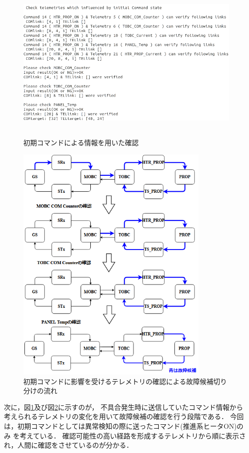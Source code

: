 \documentclass[11pt]{jsreport}
\begin{document}
\begin{figure}[H]
   \centering
      \includegraphics[height=8.0cm]{figure/COM14_TEL17_iniCOM_phase.png}
      \caption{初期コマンドによる情報を用いた確認}
      \label{fig:ini_COM_phase}
\end{figure}
\begin{figure}[H]
   \centering
      \includegraphics[height=12cm]{figure/iniCOM_process_HTR_PROP_fault.png}
      \caption{初期コマンドに影響を受けるテレメトリの確認による故障候補切り分けの流れ}
      \label{fig:iniCOM_process}
\end{figure}

次に，図\ref{fig:ini_COM_phase}及び図\ref{fig:iniCOM_process}に示すのが，
不具合発生時に送信していたコマンド情報から
考えられるテレメトリの変化を用いて故障候補の確認を行う段階である．
今回は，初期コマンドとしては異常検知の際に送ったコマンド(推進系ヒータON)のみ
を考えている．
確認可能性の高い経路を形成するテレメトリから順に表示され，人間に確認をさせているのが分かる．
\end{document}
